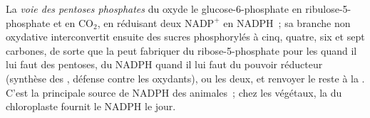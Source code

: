 \begin{definition}\label{def:b1:biosyntheses-integration:ppp}
La \emph{voie des pentoses phosphates} du  oxyde le
glucose-6-phosphate en ribulose-5-phosphate et en $\mathrm{CO_2}$, en
réduisant deux $\mathrm{NADP^+}$ en NADPH~; sa branche non oxydative
interconvertit ensuite des sucres phosphorylés à cinq, quatre, six et
sept carbones, de sorte que la  peut fabriquer du
ribose-5-phosphate pour les  quand il lui faut des pentoses,
du NADPH quand il lui faut du pouvoir réducteur (synthèse des ,
défense contre les oxydants), ou les deux, et renvoyer le reste à la
. C'est la principale source de NADPH des  animales~;
chez les végétaux, la  du chloroplaste fournit le
NADPH le jour.
\end{definition}


